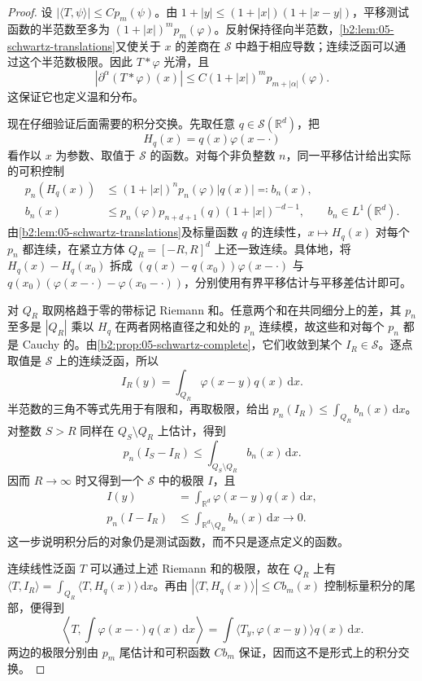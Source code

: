 \begin{proof}
设 \(|\langle T,\psi\rangle|\leq Cp_m(\psi)\)。由 \(1+|y|\leq(1+|x|)(1+|x-y|)\)，平移测试函数的半范数至多为 \((1+|x|)^m p_m(\varphi)\)。反射保持径向半范数，\cref{b2:lem:05-schwartz-translations}又使关于 \(x\) 的差商在 \(\mathcal S\) 中趋于相应导数；连续泛函可以通过这个半范数极限。因此 \(T*\varphi\) 光滑，且
\[
 |\partial^\alpha(T*\varphi)(x)|
 \leq C(1+|x|)^m p_{m+|\alpha|}(\varphi).
\]
这保证它也定义温和分布。

现在仔细验证后面需要的积分交换。先取任意 \(q\in\mathcal S(\mathbb R^d)\)，把
\[
 H_q(x)=q(x)\varphi(x-\cdot)
\]
看作以 \(x\) 为参数、取值于 \(\mathcal S\) 的函数。对每个非负整数 \(n\)，同一平移估计给出实际的可积控制
\[
 \begin{aligned}
 p_n(H_q(x))
 &\leq (1+|x|)^n p_n(\varphi)|q(x)|
 \eqqcolon b_n(x),\\
 b_n(x)&\leq p_n(\varphi)p_{n+d+1}(q)(1+|x|)^{-d-1},
 \qquad b_n\in L^1(\mathbb R^d).
 \end{aligned}
\]
由\cref{b2:lem:05-schwartz-translations}及标量函数 \(q\) 的连续性，\(x\mapsto H_q(x)\) 对每个 \(p_n\) 都连续，在紧立方体 \(Q_R=[-R,R]^d\) 上还一致连续。具体地，将 \(H_q(x)-H_q(x_0)\) 拆成 \((q(x)-q(x_0))\varphi(x-\cdot)\) 与 \(q(x_0)(\varphi(x-\cdot)-\varphi(x_0-\cdot))\)，分别使用有界平移估计与平移差估计即可。

对 \(Q_R\) 取网格趋于零的带标记 Riemann 和。任意两个和在共同细分上的差，其 \(p_n\) 至多是 \(|Q_R|\) 乘以 \(H_q\) 在两者网格直径之和处的 \(p_n\) 连续模，故这些和对每个 \(p_n\) 都是 Cauchy 的。由\cref{b2:prop:05-schwartz-complete}，它们收敛到某个 \(I_R\in\mathcal S\)。逐点取值是 \(\mathcal S\) 上的连续泛函，所以
\[
 I_R(y)=\int_{Q_R}\varphi(x-y)q(x)\,\mathrm{d}x.
\]
半范数的三角不等式先用于有限和，再取极限，给出 \(p_n(I_R)\leq\int_{Q_R}b_n(x)\,\mathrm{d}x\)。对整数 \(S>R\) 同样在 \(Q_S\setminus Q_R\) 上估计，得到
\[
 p_n(I_S-I_R)\leq\int_{Q_S\setminus Q_R}b_n(x)\,\mathrm{d}x.
\]
因而 \(R\to\infty\) 时又得到一个 \(\mathcal S\) 中的极限 \(I\)，且
\[
 \begin{aligned}
 I(y)&=\int_{\mathbb R^d}\varphi(x-y)q(x)\,\mathrm{d}x,\\
 p_n(I-I_R)&\leq\int_{\mathbb R^d\setminus Q_R}b_n(x)\,\mathrm{d}x\longrightarrow0.
 \end{aligned}
\]
这一步说明积分后的对象仍是测试函数，而不只是逐点定义的函数。

连续线性泛函 \(T\) 可以通过上述 Riemann 和的极限，故在 \(Q_R\) 上有 \(\langle T,I_R\rangle=\int_{Q_R}\langle T,H_q(x)\rangle\,\mathrm{d}x\)。再由 \(|\langle T,H_q(x)\rangle|\leq Cb_m(x)\) 控制标量积分的尾部，便得到
\[
 \left\langle T,\int\varphi(x-\cdot)q(x)\,\mathrm{d}x\right\rangle
 =\int\langle T_y,\varphi(x-y)\rangle q(x)\,\mathrm{d}x.
\]
两边的极限分别由 \(p_m\) 尾估计和可积函数 \(Cb_m\) 保证，因而这不是形式上的积分交换。


\end{proof}
